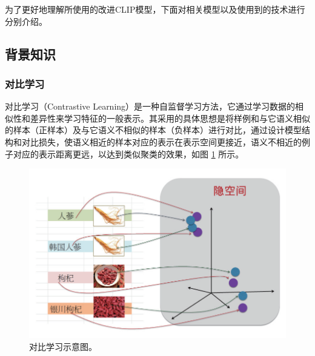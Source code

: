 \documentclass[a4paper]{zreport}
\begin{document}
为了更好地理解所使用的改进CLIP模型，下面对相关模型以及使用到的技术进行分别介绍。

\subsection{背景知识}

\subsubsection{对比学习}

对比学习（Contrastive Learning）是一种自监督学习方法\cite{liu2021self}，它通过学习数据的相似性和差异性来学习特征的一般表示。其采用的具体思想是将样例和与它语义相似的样本（正样本）及与它语义不相似的样本（负样本）进行对比，通过设计模型结构和对比损失，使语义相近的样本对应的表示在表示空间更接近，语义不相近的例子对应的表示距离更远，以达到类似聚类的效果，如图 \ref{fig:cl1} 所示。

\begin{figure}[h]
\centering
\includegraphics[width=0.75\linewidth]{figures/cl1}
\caption{对比学习示意图。}
\label{fig:cl1}
\end{figure}
\end{document}
